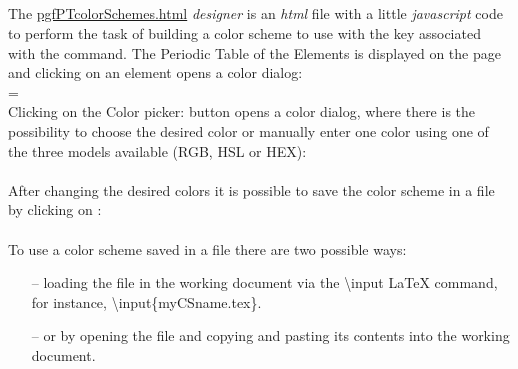 {\subsection*{}{{\normalfont\large\bfseries\raisebox{1.25pt}{$\maltese$\ Designing a color scheme with \tmpSection}}%
\label{design:CSscheme}%
\vfill{}
\vfill The \href{run:pgfPTcolorSchemes.html}{pgfPTcolorSchemes.html} \textit{designer} is an \textit{html} file with a little \textit{javascript} code to perform the task of building a color scheme to use with the  key associated with the  command.
\newpage The Periodic Table of the Elements is displayed on the page and clicking on an element opens a color dialog:
\\ [4pt]
=\hbox{}%
\\ [8pt]Clicking on the {\small Color picker:\hspace{.2ex}} button opens a color dialog, where there is the possibility to choose the desired color or manually enter one color using one of the three models available (RGB, HSL or HEX):
\\ [4pt]
\\ [8pt]After changing the desired colors it is possible to save the color scheme in a file by clicking on :
\\ [4pt]
\\ [8pt]To use a color scheme saved in a file there are two possible ways:
\begin{itemize}
\item[--]loading the file in the working document via the {\large\textsf{\textbackslash input}} \LaTeX{} command, for instance, {\large\textsf{\textbackslash input\{myCSname.tex\}}}.
\item[--]or by opening the file and copying and pasting its contents into the working document.
\end{itemize}
}}
